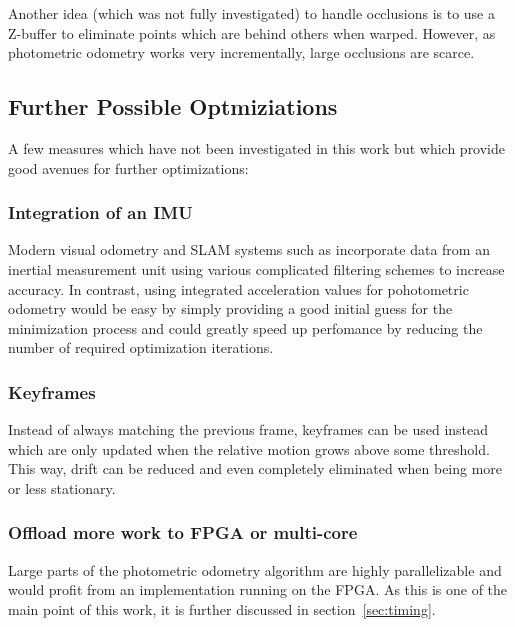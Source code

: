 Another idea (which was not fully investigated) to handle occlusions is to use a
Z-buffer to eliminate points which are behind others when warped. However, as
photometric odometry works very incrementally, large occlusions are scarce.

\subsection{Further Possible Optmiziations}

A few measures which have not been investigated in this work but which provide
good avenues for further optimizations:

\subsubsection{Integration of an IMU}

Modern visual odometry and SLAM systems such as \cite{leutenegger2013keyframe}
incorporate data from an inertial measurement unit using various complicated
filtering schemes to increase accuracy.
In contrast, using integrated acceleration values for pohotometric odometry
would be easy by simply providing a good initial guess for the minimization
process and could greatly speed up perfomance by reducing the number of
required optimization iterations.

\subsubsection{Keyframes}

Instead of always matching the previous frame, keyframes can be used instead
which are only updated when the relative motion grows above some threshold.
This way, drift can be reduced and even completely eliminated when being more
or less stationary.

\subsubsection{Offload more work to FPGA or multi-core}

Large parts of the photometric odometry algorithm are highly parallelizable and
would profit from an implementation running on the FPGA. As this is one of the
main point of this work, it is further discussed in section~\ref{sec:timing}.

